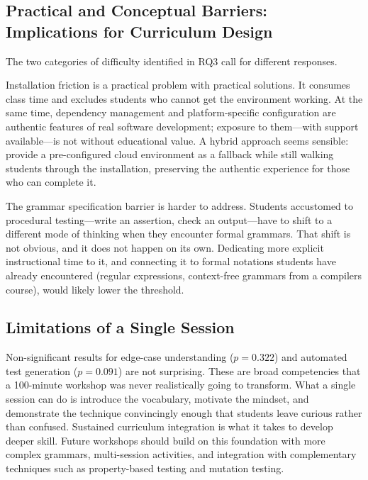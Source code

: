 \documentclass[conference]{IEEEtran}
\begin{document}
\subsection{Practical and Conceptual Barriers: Implications for Curriculum Design}

The two categories of difficulty identified in RQ3 call for different responses.

Installation friction is a practical problem with practical solutions.
It consumes class time and excludes students who cannot get the environment working.
At the same time, dependency management and platform-specific configuration are authentic features of real software development; exposure to them---with support available---is not without educational value.
A hybrid approach seems sensible: provide a pre-configured cloud environment as a fallback while still walking students through the installation, preserving the authentic experience for those who can complete it.

The grammar specification barrier is harder to address.
Students accustomed to procedural testing---write an assertion, check an output---have to shift to a different mode of thinking when they encounter formal grammars.
That shift is not obvious, and it does not happen on its own.
Dedicating more explicit instructional time to it, and connecting it to formal notations students have already encountered (regular expressions, context-free grammars from a compilers course), would likely lower the threshold.

\subsection{Limitations of a Single Session}

Non-significant results for edge-case understanding ($p = 0.322$) and automated test generation ($p = 0.091$) are not surprising.
These are broad competencies that a 100-minute workshop was never realistically going to transform.
What a single session can do is introduce the vocabulary, motivate the mindset, and demonstrate the technique convincingly enough that students leave curious rather than confused.
Sustained curriculum integration is what it takes to develop deeper skill.
Future workshops should build on this foundation with more complex grammars, multi-session activities, and integration with complementary techniques such as property-based testing and mutation testing.

\end{document}
